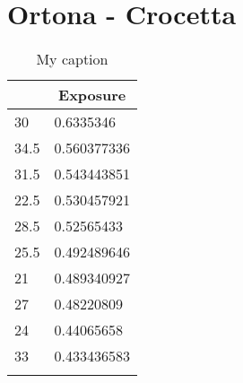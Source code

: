 \section{Ortona - Crocetta}
\begin{table}[H]
	\centering
	\caption{My caption}
	\label{my-label}
	\begin{tabular}{|l|l|}
		\hline
		\rowcolor[HTML]{C0C0C0} 
		\multicolumn{1}{|c|}{\cellcolor[HTML]{C0C0C0}\textbf{Km}} & \multicolumn{1}{c|}{\cellcolor[HTML]{C0C0C0}\textbf{Exposure}} \\ \hline
		\rowcolor[HTML]{F8FF00} 
		30                                                        & 0.6335346                                                      \\ \hline
		\rowcolor[HTML]{F8FF00} 
		34.5                                                      & 0.560377336                                                    \\ \hline
		\rowcolor[HTML]{F8FF00} 
		31.5                                                      & 0.543443851                                                    \\ \hline
		\rowcolor[HTML]{F8FF00} 
		22.5                                                      & 0.530457921                                                    \\ \hline
		\rowcolor[HTML]{F8FF00} 
		28.5                                                      & 0.52565433                                                     \\ \hline
		\rowcolor[HTML]{F8FF00} 
		25.5                                                      & 0.492489646                                                    \\ \hline
		\rowcolor[HTML]{F8FF00} 
		21                                                        & 0.489340927                                                    \\ \hline
		\rowcolor[HTML]{F8FF00} 
		27                                                        & 0.48220809                                                     \\ \hline
		\rowcolor[HTML]{F8FF00} 
		24                                                        & 0.44065658                                                     \\ \hline
		\rowcolor[HTML]{F8FF00} 
		33                                                        & 0.433436583                                                    \\ \hline
		\rowcolor[HTML]{F8FF00} 

\end{tabular}
\end{table}
